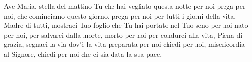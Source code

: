 \beginverse
Ave Maria, stella del mattino
Tu che hai vegliato questa notte per noi
prega per noi, che cominciamo questo giorno,
prega per noi per tutti i giorni della vita,
Madre di tutti, mostraci Tuo foglio
che Tu hai portato nel Tuo seno per noi
nato per noi, per salvarci dalla morte,
morto per noi per condurci alla vita,
Piena di grazia, segnaci la via
dov'è la vita preparata per noi
chiedi per noi, misericordia al Signore,
chiedi per noi che ci sia data la sua pace,
\endverse
\endsong
